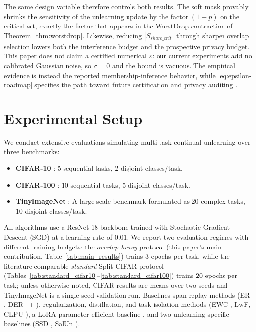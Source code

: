 \documentclass[conference]{IEEEtran}
\theoremstyle{plain}
\theoremstyle{definition}
\theoremstyle{remark}
\begin{document}
The same design variable therefore controls both results. The soft
mask provably shrinks the sensitivity of the unlearning update by the
factor $(1-p)$ on the critical set, exactly the factor that appears in
the WorstDrop contraction of Theorem~\ref{thm:worstdrop}. Likewise,
reducing $|S_{share\_crit}|$ through sharper overlap selection lowers
both the interference budget and the prospective privacy budget. This
paper does not claim a certified numerical $\varepsilon$: our current
experiments add no calibrated Gaussian noise, so $\sigma=0$ and the
bound is vacuous. The empirical evidence is instead the reported
membership-inference behavior, while \eqref{eq:epsilon-roadmap}
specifies the path toward future certification and privacy auditing
\cite{steinke2024privacy}.

\section{Experimental Setup}

We conduct extensive evaluations simulating multi-task continual unlearning over three benchmarks:
\begin{itemize}
    \item \textbf{CIFAR-10} \cite{krizhevsky2009learning}: 5 sequential tasks, 2 disjoint classes/task.
    \item \textbf{CIFAR-100} \cite{krizhevsky2009learning}: 10 sequential tasks, 5 disjoint classes/task.
    \item \textbf{TinyImageNet} \cite{le2015tinyimagenet}: A large-scale benchmark formulated as 20 complex tasks, 10 disjoint classes/task.
\end{itemize}
All algorithms use a ResNet-18 backbone \cite{he2016deep} trained with Stochastic Gradient Descent (SGD) \cite{robbins1951sgd} at a learning rate of \(0.01\). We report two evaluation regimes with different training budgets: the \emph{overlap-heavy} protocol (this paper's main contribution, Table~\ref{tab:main_results}) trains \(3\) epochs per task, while the literature-comparable \emph{standard} Split-CIFAR protocol (Tables~\ref{tab:standard_cifar10}--\ref{tab:standard_cifar100}) trains \(20\) epochs per task; unless otherwise noted, CIFAR results are means over two seeds and TinyImageNet is a single-seed validation run. Baselines span replay methods (ER \cite{thrun1995lifelong}, DER++ \cite{buzzega2020dark}), regularization, distillation, and task-isolation methods (EWC \cite{kirkpatrick2017overcoming}, LwF, CLPU \cite{liu2022clpu}), a LoRA parameter-efficient baseline \cite{hu2021lora}, and two unlearning-specific baselines (SSD \cite{foster2024ssd}, SalUn \cite{fan2024salun}).
\end{document}
